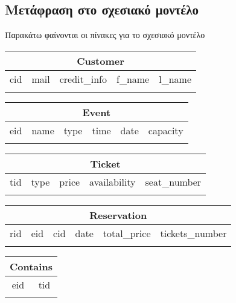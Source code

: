 \documentclass[a4paper, 11pt]{article}
\begin{document}
\subsection*{Μετάφραση στο σχεσιακό μοντέλο}
Παρακάτω φαίνονται οι πίνακες για το σχεσιακό μοντέλο\\
\noindent
\begin{tabular}{|c|c|c|c|c|}
\hline
\multicolumn{5}{|c|}{Customer} \\
\hline
cid & mail & credit\_info & f\_name & l\_name \\
\hline
& & & & \\
\hline
\end{tabular}

\vspace{10pt}

\noindent
\begin{tabular}{|c|c|c|c|c|c|}
\hline
\multicolumn{6}{|c|}{Event} \\
\hline
eid & name & type & time & date & capacity \\
\hline
& & & & & \\
\hline
\end{tabular}

\vspace{10pt}

\noindent
\begin{tabular}{|c|c|c|c|c|}
\hline
\multicolumn{5}{|c|}{Ticket} \\
\hline
tid & type & price & availability & seat\_number \\
\hline
& & & & \\
\hline
\end{tabular}

\vspace{10pt}

\noindent
\begin{tabular}{|c|c|c|c|c|c|}
\hline
\multicolumn{6}{|c|}{Reservation} \\
\hline
rid & eid & cid & date & total\_price & tickets\_number \\
\hline
& & & & & \\
\hline
\end{tabular}

\vspace{10pt}


\noindent
\begin{tabular}{|c|c|}
\hline
\multicolumn{2}{|c|}{Contains} \\
\hline
eid & tid \\
\hline
& \\
\hline
\end{tabular}
\end{document}
